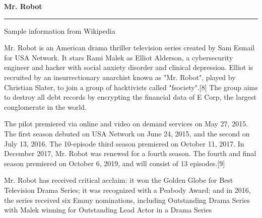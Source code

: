 \documentclass{letter} %
\date{ } %
\begin{document}
\longindentation=0pt                       %
\let\raggedleft\raggedright                %
 
\begin{letter}


\begin{center}
{\large\bf Mr. Robot} 
\end{center}
\medskip\hrule height 1pt
\begin{center}
{Sample information from Wikipedia } 
\end{center} \vspace{0.5 cm} %
Mr. Robot is an American drama thriller television series created by Sam Esmail for USA Network. It stars Rami Malek as Elliot Alderson, a cybersecurity engineer and hacker with social anxiety disorder and clinical depression. Elliot is recruited by an insurrectionary anarchist known as "Mr. Robot", played by Christian Slater, to join a group of hacktivists called "fsociety".[8] The group aims to destroy all debt records by encrypting the financial data of E Corp, the largest conglomerate in the world.

The pilot premiered via online and video on demand services on May 27, 2015. The first season debuted on USA Network on June 24, 2015, and the second on July 13, 2016. The 10-episode third season premiered on October 11, 2017. In December 2017, Mr. Robot was renewed for a fourth season. The fourth and final season premiered on October 6, 2019, and will consist of 13 episodes.[9]

Mr. Robot has received critical acclaim: it won the Golden Globe for Best Television Drama Series; it was recognized with a Peabody Award; and in 2016, the series received six Emmy nominations, including Outstanding Drama Series with Malek winning for Outstanding Lead Actor in a Drama Series

\end{letter}
\end{document}
